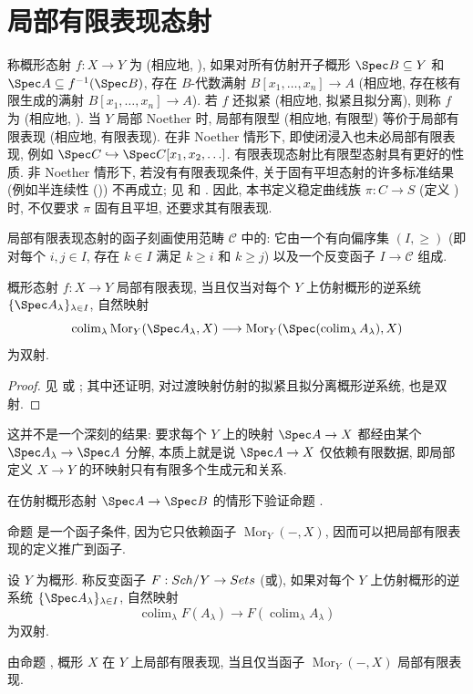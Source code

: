 \section{局部有限表现态射}\label{src:A.1}
称概形态射 $f:X\to Y$ 为 (相应地, ), 如果对所有仿射开子概形 $\Spec B\subseteq Y$ 和 $\Spec A\subseteq f^{-1}(\Spec B)$, 存在 $B$-代数满射 $B[x_1,\ldots,x_n]\to A$ (相应地, 存在核有限生成的满射 $B[x_1,\ldots,x_n]\to A$). 若 $f$ 还拟紧 (相应地, 拟紧且拟分离), 则称 $f$ 为 (相应地, ). 当 $Y$ 局部 Noether 时, 局部有限型 (相应地, 有限型) 等价于局部有限表现 (相应地, 有限表现). 在非 Noether 情形下, 即使闭浸入也未必局部有限表现, 例如 $\Spec\mathbb C\hookrightarrow\Spec\mathbb C[x_1,x_2,\ldots]$. 有限表现态射比有限型态射具有更好的性质. 非 Noether 情形下, 若没有有限表现条件, 关于固有平坦态射的许多标准结果 (例如半连续性 ()) 不再成立; 见 \cite[\S$28.2.11$]{Vak17} 和 \cite[Tag 05LB]{SP}. 因此, 本书定义稳定曲线族 $\pi:C\to S$ (定义 ) 时, 不仅要求 $\pi$ 固有且平坦, 还要求其有限表现.

局部有限表现态射的函子刻画使用范畴 $\mathcal C$ 中的: 它由一个有向偏序集 $(I,\geq)$ (即对每个 $i,j\in I$, 存在 $k\in I$ 满足 $k\geq i$ 和 $k\geq j$) 以及一个反变函子 $I\to\mathcal C$ 组成.
\begin{proposition}\label{src:A.1.1}
概形态射 $f:X\to Y$ 局部有限表现, 当且仅当对每个 $Y$ 上仿射概形的逆系统 $\{\Spec A_\lambda\}_{\lambda\in I}$, 自然映射
\begin{equation}\label{src:A.1.2}
\operatorname{colim}_\lambda\operatorname{Mor}_Y(\Spec A_\lambda,X)\longrightarrow\operatorname{Mor}_Y(\Spec(\operatorname{colim}_\lambda A_\lambda),X)
\end{equation}
为双射.
\end{proposition}
\begin{proof}
见 \cite[IV.$8.14.2$]{EGA} 或 \cite[Tag 01ZC]{SP}; 其中还证明, 对过渡映射仿射的拟紧且拟分离概形逆系统,  也是双射.
\end{proof}
这并不是一个深刻的结果: 要求每个 $Y$ 上的映射 $\Spec A\to X$ 都经由某个 $\Spec A_\lambda\to\Spec A$ 分解, 本质上就是说 $\Spec A\to X$ 仅依赖有限数据, 即局部定义 $X\to Y$ 的环映射只有有限多个生成元和关系.
\begin{exercise}\label{src:A.1.3}
在仿射概形态射 $\Spec A\to\Spec B$ 的情形下验证命题 .
\end{exercise}
命题  是一个函子条件, 因为它只依赖函子 $\operatorname{Mor}_Y(-,X)$, 因而可以把局部有限表现的定义推广到函子.
\begin{definition}\label{src:A.1.4}
设 $Y$ 为概形. 称反变函子 $F:Sch/Y\to Sets$  (或), 如果对每个 $Y$ 上仿射概形的逆系统 $\{\Spec A_\lambda\}_{\lambda\in I}$, 自然映射
\[
\operatorname{colim}_\lambda F(A_\lambda)\longrightarrow F(\operatorname{colim}_\lambda A_\lambda)
\]
为双射.
\end{definition}
由命题 , 概形 $X$ 在 $Y$ 上局部有限表现, 当且仅当函子 $\operatorname{Mor}_Y(-,X)$ 局部有限表现.
